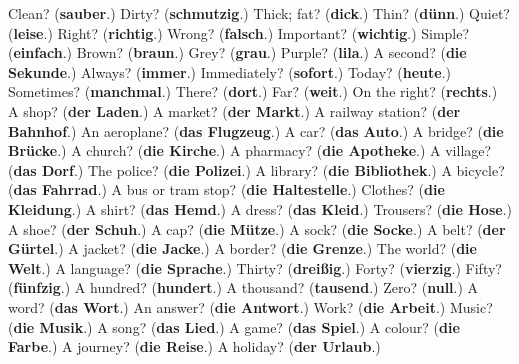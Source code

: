 \begin{tcolorbox}[breakable,colback=teal!4,colframe=teal!35!black,title={Before you move on}]
Clean? (\textbf{sauber}.) Dirty? (\textbf{schmutzig}.) Thick; fat? (\textbf{dick}.) Thin? (\textbf{dünn}.) Quiet? (\textbf{leise}.) Right? (\textbf{richtig}.) Wrong? (\textbf{falsch}.) Important? (\textbf{wichtig}.) Simple? (\textbf{einfach}.) Brown? (\textbf{braun}.) Grey? (\textbf{grau}.) Purple? (\textbf{lila}.) A second? (\textbf{die Sekunde}.) Always? (\textbf{immer}.) Immediately? (\textbf{sofort}.) Today? (\textbf{heute}.) Sometimes? (\textbf{manchmal}.) There? (\textbf{dort}.) Far? (\textbf{weit}.) On the right? (\textbf{rechts}.) A shop? (\textbf{der Laden}.) A market? (\textbf{der Markt}.) A railway station? (\textbf{der Bahnhof}.) An aeroplane? (\textbf{das Flugzeug}.) A car? (\textbf{das Auto}.) A bridge? (\textbf{die Brücke}.) A church? (\textbf{die Kirche}.) A pharmacy? (\textbf{die Apotheke}.) A village? (\textbf{das Dorf}.) The police? (\textbf{die Polizei}.) A library? (\textbf{die Bibliothek}.) A bicycle? (\textbf{das Fahrrad}.) A bus or tram stop? (\textbf{die Haltestelle}.) Clothes? (\textbf{die Kleidung}.) A shirt? (\textbf{das Hemd}.) A dress? (\textbf{das Kleid}.) Trousers? (\textbf{die Hose}.) A shoe? (\textbf{der Schuh}.) A cap? (\textbf{die Mütze}.) A sock? (\textbf{die Socke}.) A belt? (\textbf{der Gürtel}.) A jacket? (\textbf{die Jacke}.) A border? (\textbf{die Grenze}.) The world? (\textbf{die Welt}.) A language? (\textbf{die Sprache}.) Thirty? (\textbf{dreißig}.) Forty? (\textbf{vierzig}.) Fifty? (\textbf{fünfzig}.) A hundred? (\textbf{hundert}.) A thousand? (\textbf{tausend}.) Zero? (\textbf{null}.) A word? (\textbf{das Wort}.) An answer? (\textbf{die Antwort}.) Work? (\textbf{die Arbeit}.) Music? (\textbf{die Musik}.) A song? (\textbf{das Lied}.) A game? (\textbf{das Spiel}.) A colour? (\textbf{die Farbe}.) A journey? (\textbf{die Reise}.) A holiday? (\textbf{der Urlaub}.)
\end{tcolorbox}
